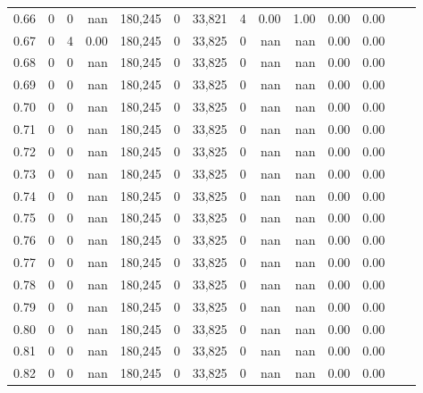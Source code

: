 \begin{tabular}{rrrrrrrrrrrrrr}
0.66 &      0 &      0 &     nan &  180,245 &        0 &  33,821 &       4 &  0.00 &  1.00 &  0.00 &      0.00 \\
0.67 &      0 &      4 &    0.00 &  180,245 &        0 &  33,825 &       0 &   nan &   nan &  0.00 &      0.00 \\
0.68 &      0 &      0 &     nan &  180,245 &        0 &  33,825 &       0 &   nan &   nan &  0.00 &      0.00 \\
0.69 &      0 &      0 &     nan &  180,245 &        0 &  33,825 &       0 &   nan &   nan &  0.00 &      0.00 \\
0.70 &      0 &      0 &     nan &  180,245 &        0 &  33,825 &       0 &   nan &   nan &  0.00 &      0.00 \\
0.71 &      0 &      0 &     nan &  180,245 &        0 &  33,825 &       0 &   nan &   nan &  0.00 &      0.00 \\
0.72 &      0 &      0 &     nan &  180,245 &        0 &  33,825 &       0 &   nan &   nan &  0.00 &      0.00 \\
0.73 &      0 &      0 &     nan &  180,245 &        0 &  33,825 &       0 &   nan &   nan &  0.00 &      0.00 \\
0.74 &      0 &      0 &     nan &  180,245 &        0 &  33,825 &       0 &   nan &   nan &  0.00 &      0.00 \\
0.75 &      0 &      0 &     nan &  180,245 &        0 &  33,825 &       0 &   nan &   nan &  0.00 &      0.00 \\
0.76 &      0 &      0 &     nan &  180,245 &        0 &  33,825 &       0 &   nan &   nan &  0.00 &      0.00 \\
0.77 &      0 &      0 &     nan &  180,245 &        0 &  33,825 &       0 &   nan &   nan &  0.00 &      0.00 \\
0.78 &      0 &      0 &     nan &  180,245 &        0 &  33,825 &       0 &   nan &   nan &  0.00 &      0.00 \\
0.79 &      0 &      0 &     nan &  180,245 &        0 &  33,825 &       0 &   nan &   nan &  0.00 &      0.00 \\
0.80 &      0 &      0 &     nan &  180,245 &        0 &  33,825 &       0 &   nan &   nan &  0.00 &      0.00 \\
0.81 &      0 &      0 &     nan &  180,245 &        0 &  33,825 &       0 &   nan &   nan &  0.00 &      0.00 \\
0.82 &      0 &      0 &     nan &  180,245 &        0 &  33,825 &       0 &   nan &   nan &  0.00 &      0.00 \\

\end{tabular}
